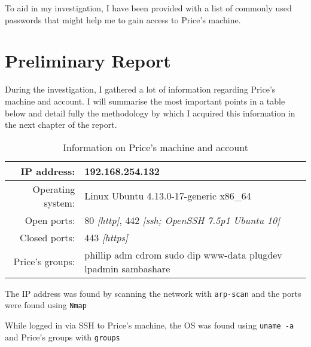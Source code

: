 \documentclass[12pt]{report}
\newcommand{\term}[1]{\colorbox{light-gray}{\texttt{#1}}}
\begin{document}
To aid in my investigation, I have been provided with a list of commonly used passwords that might help me to gain access to Price's machine.




\pagebreak
\chapter{Preliminary Report}
During the investigation, I gathered a lot of information regarding Price's machine and account. I will summarise the most important points in a table below and detail fully the methodology by which I acquired this information in the next chapter of the report.

\begin{table}[h!]
  \centering
  \begin{tabular}{|r l|}
    \hline
    IP address: & 192.168.254.132 \\
    \hline
    Operating system: & Linux Ubuntu 4.13.0-17-generic x86\_64 \\
    \hline
    Open ports: & 80 \textit{[http]}, 442 \textit{[ssh; OpenSSH 7.5p1 Ubuntu 10]} \\
    \hline
    Closed ports: & 443 \textit{[https]} \\
    \hline
    Price's groups: & phillip adm cdrom sudo dip www-data plugdev lpadmin sambashare \\
    \hline
  \end{tabular}
  \caption{Information on Price's machine and account}
  \label{table:pricemachineinfo}
\end{table}

The IP address was found by scanning the network with \texttt{arp-scan} and the ports were found using \texttt{Nmap}

While logged in via SSH to Price's machine, the OS was found using \term{uname -a} and Price's groups with \term{groups}
\end{document}
